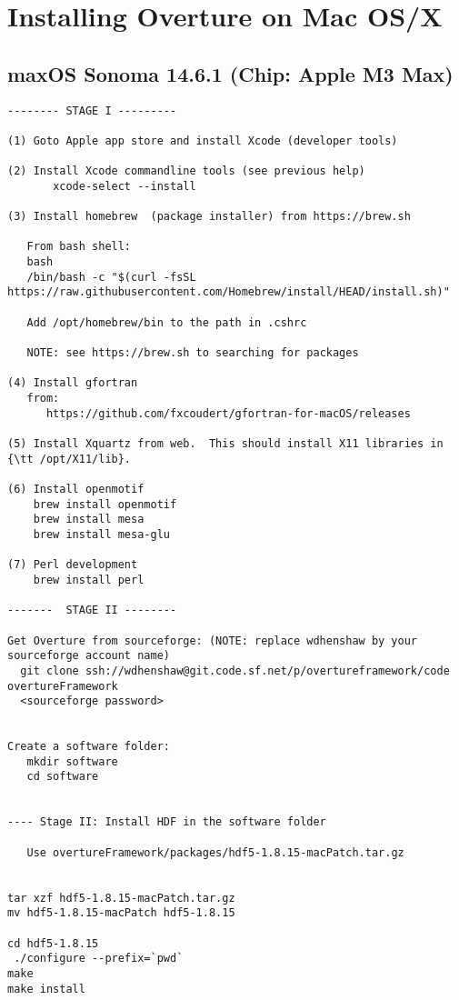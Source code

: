 \section{Installing Overture on Mac OS/X}  \label{sec:installMac}


\subsection{maxOS Sonoma 14.6.1  (Chip: Apple M3 Max)} 


\begin{verbatim}
-------- STAGE I ---------

(1) Goto Apple app store and install Xcode (developer tools)

(2) Install Xcode commandline tools (see previous help)
       xcode-select --install    

(3) Install homebrew  (package installer) from https://brew.sh

   From bash shell: 
   bash
   /bin/bash -c "$(curl -fsSL https://raw.githubusercontent.com/Homebrew/install/HEAD/install.sh)"

   Add /opt/homebrew/bin to the path in .cshrc

   NOTE: see https://brew.sh to searching for packages

(4) Install gfortran
   from:
      https://github.com/fxcoudert/gfortran-for-macOS/releases

(5) Install Xquartz from web.  This should install X11 libraries in {\tt /opt/X11/lib}.

(6) Install openmotif
    brew install openmotif
    brew install mesa
    brew install mesa-glu

(7) Perl development 
    brew install perl
    
-------  STAGE II --------

Get Overture from sourceforge: (NOTE: replace wdhenshaw by your sourceforge account name)
  git clone ssh://wdhenshaw@git.code.sf.net/p/overtureframework/code overtureFramework
  <sourceforge password>


Create a software folder:
   mkdir software
   cd software


---- Stage II: Install HDF in the software folder

   Use overtureFramework/packages/hdf5-1.8.15-macPatch.tar.gz


tar xzf hdf5-1.8.15-macPatch.tar.gz
mv hdf5-1.8.15-macPatch hdf5-1.8.15

cd hdf5-1.8.15
 ./configure --prefix=`pwd` 
make
make install



\end{verbatim}
